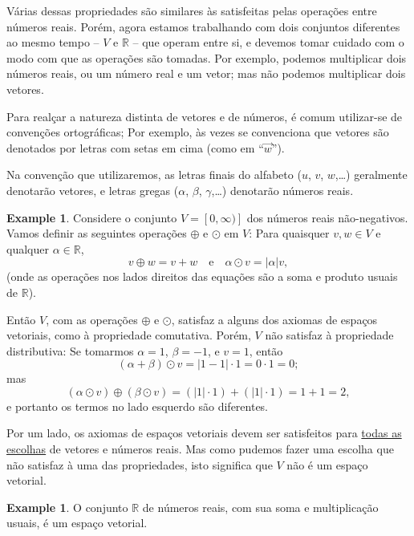 \documentclass[a4paper]{amsart}
\theoremstyle{plain}    \newtheorem{theorem}[generalnumbering]{Theorem}
\theoremstyle{plain}    \newtheorem{corollary}[generalnumbering]{Corollary}
\theoremstyle{definition}   \newtheorem{definition}[generalnumbering]{Definition}
\theoremstyle{definition}   \newtheorem{example}[generalnumbering]{Example}
\theoremstyle{plain}    \newtheorem{proposition}[generalnumbering]{Proposition}
\theoremstyle{plain}    \newtheorem{lemma}[generalnumbering]{Lemma}
\theoremstyle{plain}    \newtheorem{plainstyle}[generalnumbering]{\namefordifferentenvironment}
\theoremstyle{plain}    \newtheorem*{plainstyle*}{\namefordifferentenvironment}
\theoremstyle{definition}    \newtheorem{definitionstyle}[generalnumbering]{\namefordifferentenvironment}
\theoremstyle{definition}    \newtheorem*{definitionstyle*}{\namefordifferentenvironment}
\begin{document}
Várias dessas propriedades são similares às satisfeitas pelas operações entre números reais. Porém, agora estamos trabalhando com dois conjuntos diferentes ao mesmo tempo -- $V$ e $\mathbb{R}$ -- que operam entre si, e devemos tomar cuidado com o modo com que as operações são tomadas. Por exemplo, podemos multiplicar dois números reais, ou um número real e um vetor; mas não podemos multiplicar dois vetores.

Para realçar a natureza distinta de vetores e de números, é comum utilizar-se de convenções ortográficas; Por exemplo, às vezes se convenciona que vetores são denotados por letras com setas em cima (como em ``$\vec{w}$'').

Na convenção que utilizaremos, as letras finais do alfabeto ($u$, $v$, $w$,\ldots) geralmente denotarão vetores, e letras gregas ($\alpha$, $\beta$, $\gamma$,\ldots) denotarão números reais.

\begin{example}
    Considere o conjunto $V=[0,\infty)]$ dos números reais não-negativos. Vamos definir as seguintes operações $\oplus$ e $\odot$ em $V$: Para quaisquer $v,w\in V$ e qualquer $\alpha\in\mathbb{R}$,
    \[v\oplus w=v+w\quad\text{e}\quad\alpha \odot v=|\alpha|v,\]
    (onde as operações nos lados direitos das equações são a soma e produto usuais de $\mathbb{R}$).
    
    Então $V$, com as operações $\oplus$ e $\odot$, satisfaz a alguns dos axiomas de espaços vetoriais, como à propriedade comutativa. Porém, $V$ não satisfaz à propriedade distributiva: Se tomarmos $\alpha=1$, $\beta=-1$, e $v=1$, então
    \[(\alpha+\beta)\odot v=|1-1|\cdot 1=0\cdot 1=0;\]
    mas
    \[(\alpha\odot v)\oplus(\beta\odot v)=(|1|\cdot 1)+(|1|\cdot 1)=1+1=2,\]
    e portanto os termos no lado esquerdo são diferentes.
    
    Por um lado, os axiomas de espaços vetoriais devem ser satisfeitos para \uline{todas as escolhas} de vetores e números reais. Mas como pudemos fazer uma escolha que não satisfaz à uma das propriedades, isto significa que $V$ não é um espaço vetorial.
\end{example}

\begin{example}
    O conjunto $\mathbb{R}$ de números reais, com sua soma e multiplicação usuais, é um espaço vetorial.
\end{example}

%

\printbibliography  %
\end{document}
